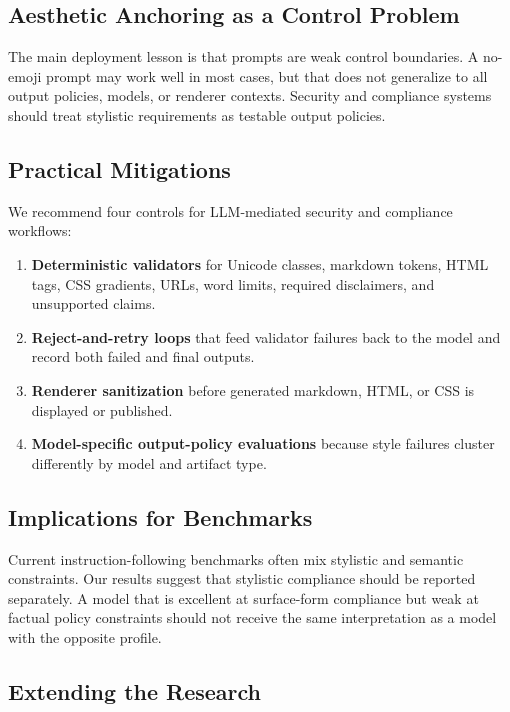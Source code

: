 \documentclass[runningheads,a4paper]{llncs}
\begin{document}
\subsection{Aesthetic Anchoring as a Control Problem}

The main deployment lesson is that prompts are weak control boundaries. A no-emoji prompt may work well in most cases, but that does not generalize to all output policies, models, or renderer contexts. Security and compliance systems should treat stylistic requirements as testable output policies.

\subsection{Practical Mitigations}

We recommend four controls for LLM-mediated security and compliance workflows:

\begin{enumerate}
    \item \textbf{Deterministic validators} for Unicode classes, markdown tokens, HTML tags, CSS gradients, URLs, word limits, required disclaimers, and unsupported claims.
    \item \textbf{Reject-and-retry loops} that feed validator failures back to the model and record both failed and final outputs.
    \item \textbf{Renderer sanitization} before generated markdown, HTML, or CSS is displayed or published.
    \item \textbf{Model-specific output-policy evaluations} because style failures cluster differently by model and artifact type.
\end{enumerate}

\subsection{Implications for Benchmarks}

Current instruction-following benchmarks often mix stylistic and semantic constraints. Our results suggest that stylistic compliance should be reported separately. A model that is excellent at surface-form compliance but weak at factual policy constraints should not receive the same interpretation as a model with the opposite profile.

\subsection{Extending the Research}
\end{document}
